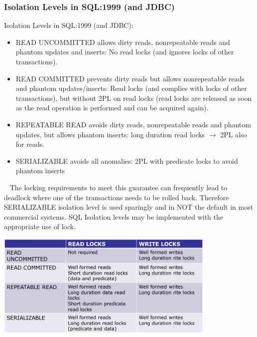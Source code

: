 \subsubsection{Isolation Levels in SQL:1999 (and JDBC)}
Isolation Levels in SQL:1999 (and JDBC):
\begin{itemize}
    \item READ UNCOMMITTED allows dirty reads, nonrepeatable reads and
    phantom updates and inserts: No read locks (and ignores locks of other transactions).
    \item READ COMMITTED prevents dirty reads but allows nonrepeatable
    reads and phantom updates/inserts: Read locks (and complies with locks of other transactions), but
    without 2PL on read locks (read locks are released as soon as
    the read operation is performed and can be acquired again).
    \item REPEATABLE READ avoids dirty reads, nonrepeatable reads and
    phantom updates, but allows phantom inserts: long duration read locks $\rightarrow$ 2PL also for reads.
    \item SERIALIZABLE avoids all anomalies: 2PL with predicate locks to avoid phantom inserts
\end{itemize}
\ \newline
The locking requirements to meet this guarantee can
frequently lead to deadlock where one of the transactions
needs to be rolled back. Therefore SERIALIZABLE isolation level is used sparingly and
in NOT the default in most commercial systems.
\newline
\newline
SQL Isolation levels may be implemented with the appropriate
use of lock.
\begin{center}
    \includegraphics[height=5cm]{../arguments/isolationlevels.JPG}
\end{center}
